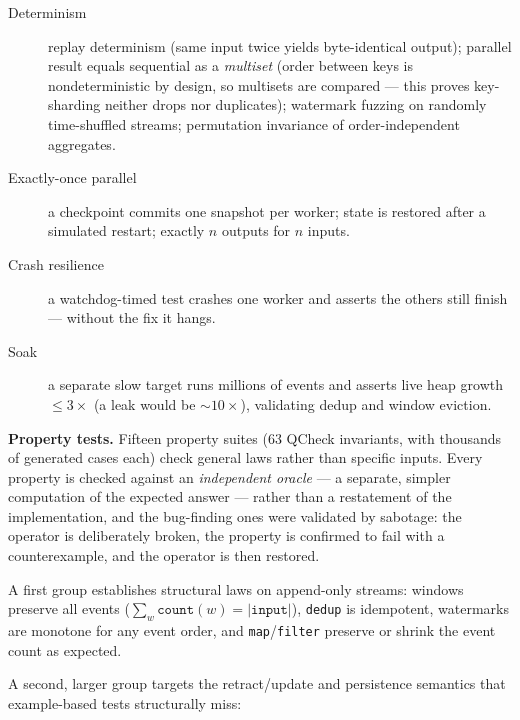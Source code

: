 \documentclass[11pt,a4paper]{article}
\begin{document}
\begin{description}
\item[Determinism] replay determinism (same input twice yields
  byte-identical output); parallel result equals sequential as a
  {\it multiset} (order between keys is nondeterministic by design, so
  multisets are compared — this proves key-sharding neither drops nor
  duplicates); watermark fuzzing on randomly time-shuffled streams;
  permutation invariance of order-independent aggregates.
\item[Exactly-once parallel] a checkpoint commits one snapshot per
  worker; state is restored after a simulated restart; exactly $n$
  outputs for $n$ inputs.
\item[Crash resilience] a watchdog-timed test crashes one worker and
  asserts the others still finish — without the fix it hangs.
\item[Soak] a separate slow target runs millions of events and asserts
  live heap growth $\leq 3\times$ (a leak would be $\sim 10\times$),
  validating dedup and window eviction.
\end{description}

\textbf{Property tests.} Fifteen property suites (63 QCheck
invariants, with thousands of generated cases each) check general laws
rather than specific inputs. Every property is checked against an
\emph{independent oracle} --- a separate, simpler computation of the
expected answer --- rather than a restatement of the implementation,
and the bug-finding ones were validated by sabotage: the operator is
deliberately broken, the property is confirmed to fail with a
counterexample, and the operator is then restored.

A first group establishes structural laws on append-only streams:
windows preserve all events ($\sum_w \mathtt{count}(w) = |\mathtt{input}|$),
\texttt{dedup} is idempotent, watermarks are monotone for any event
order, and \texttt{map}/\texttt{filter} preserve or shrink the event
count as expected.

A second, larger group targets the retract/update and persistence
semantics that example-based tests structurally miss:
\end{document}

